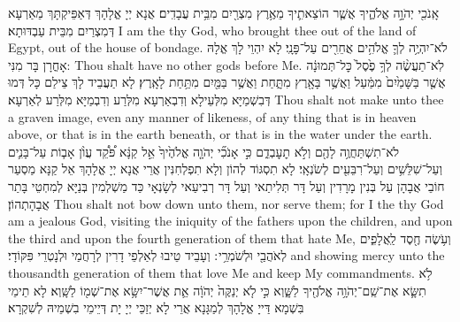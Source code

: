 {אָֽנֹכִ֖י יְהֹוָ֣ה אֱלֹהֶ֑יךָ אֲשֶׁ֧ר הוֹצֵאתִ֛יךָ מֵאֶ֥רֶץ מִצְרַ֖יִם מִבֵּ֥ית עֲבָדִֽים׃}
{אֲנָא יְיָ אֱלָהָךְ דְּאַפֵּיקְתָּךְ מֵאַרְעָא דְּמִצְרַיִם מִבֵּית עַבְדּוּתָא׃}
{I am the \lord\space thy God, who brought thee out of the land of Egypt, out of the house of bondage.}{}
{לֹא־יִהְיֶ֥ה לְךָ֛ אֱלֹהִ֥ים אֲחֵרִ֖ים עַל־פָּנָֽי׃}
{לָא יִהְוֵי לָךְ אֱלָהּ אָחֳרָן בָּר מִנִּי:}
{Thou shalt have no other gods before Me.}{}
{לֹֽא־תַעֲשֶׂ֨ה לְךָ֥ פֶ֙סֶל֙ כׇּל־תְּמוּנָ֔ה אֲשֶׁ֤ר בַּשָּׁמַ֙יִם֙ מִמַּ֔עַל וַאֲשֶׁ֥ר בָּאָ֖רֶץ מִתָּ֑חַת וַאֲשֶׁ֥ר בַּמַּ֖יִם מִתַּ֥חַת לָאָֽרֶץ׃}
{לָא תַעֲבֵיד לָךְ צֵילַם כָּל דְּמוּ דְּבִשְׁמַיָּא מִלְּעֵילָא וְדִבְאַרְעָא מִלְּרַע וְדִבְמַיָּא מִלְּרַע לְאַרְעָא׃}
{Thou shalt not make unto thee a graven image, even any manner of likeness, of any thing that is in heaven above, or that is in the earth beneath, or that is in the water under the earth.}{}
{לֹא־תִשְׁתַּחֲוֶ֥ה לָהֶ֖ם וְלֹ֣א תׇעׇבְדֵ֑ם כִּ֣י אָנֹכִ֞י יְהֹוָ֤ה אֱלֹהֶ֙יךָ֙ אֵ֣ל קַנָּ֔א פֹּ֠קֵ֠ד עֲוֺ֨ן אָב֧וֹת עַל־בָּנִ֛ים וְעַל־שִׁלֵּשִׁ֥ים וְעַל־רִבֵּעִ֖ים לְשֹׂנְאָֽי׃}
{לָא תִסְגּוֹד לְהוֹן וְלָא תִפְלְחִנִּין אֲרֵי אֲנָא יְיָ אֱלָהָךְ אֵל קַנָּא מַסְעַר חוֹבֵי אֲבָהָן עַל בְּנִין מָרָדִין וְעַל דָּר תְּלִיתַאי וְעַל דָּר רְבִיעַאי לְשָׂנְאָי כַּד מַשְׁלְמִין בְּנַיָּא לְמִחְטֵי בָּתַר אֲבָהָתְהוֹן׃}
{Thou shalt not bow down unto them, nor serve them; for I the \lord\space thy God am a jealous God, visiting the iniquity of the fathers upon the children, and upon the third and upon the fourth generation of them that hate Me,}{}
{וְעֹ֥שֶׂה חֶ֖סֶד לַֽאֲלָפִ֑ים לְאֹהֲבַ֖י וּלְשֹׁמְרֵ֥י ׃\setuma}
{וְעָבֵיד טֵיבוּ לְאַלְפֵי דָרִין לְרָחֲמַי וּלְנָטְרֵי פִּקּוֹדָי׃}
{and showing mercy unto the thousandth generation of them that love Me and keep My commandments.}{}
{לֹ֥א תִשָּׂ֛א אֶת־שֵֽׁם־יְהֹוָ֥ה אֱלֹהֶ֖יךָ לַשָּׁ֑וְא כִּ֣י לֹ֤א יְנַקֶּה֙ יְהֹוָ֔ה אֵ֛ת אֲשֶׁר־יִשָּׂ֥א אֶת־שְׁמ֖וֹ לַשָּֽׁוְא׃\setuma}
{לָא תֵימֵי בִּשְׁמָא דַּייָ אֱלָהָךְ לְמַגָּנָא אֲרֵי לָא יְזַכֵּי יְיָ יָת דְּיֵימֵי בִשְׁמֵיהּ לְשִׁקְרָא׃}
